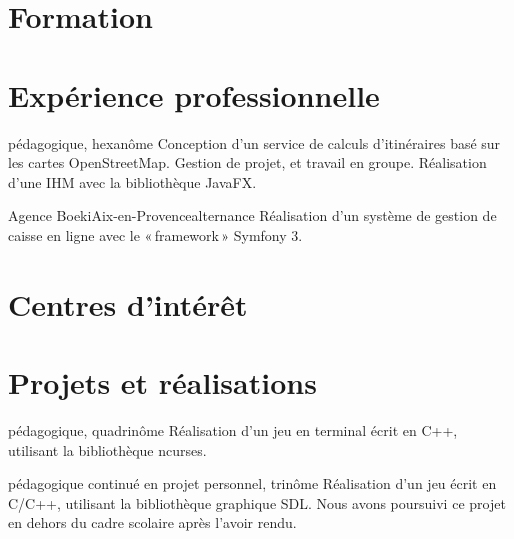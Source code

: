 \documentclass[11pt,a4paper]{moderncv}
\begin{document}
\section{Formation}


\section{Expérience professionnelle}
        {pédagogique, hexanôme}{}{}{
          Conception d'un service de calculs d'itinéraires basé sur les cartes OpenStreetMap.\newline
          Gestion de projet, et travail en groupe.\newline
          Réalisation d'une IHM avec la bibliothèque JavaFX.
        }

        {Agence Boeki}{Aix-en-Provence}{alternance}{
          Réalisation d'un système de gestion de caisse en ligne avec le «\,framework\,» Symfony 3.
        }

\section{Centres d'intérêt}





\section{Projets et réalisations}

        {pédagogique, quadrinôme}{}{}{
          Réalisation d'un jeu en terminal écrit en C++, utilisant la bibliothèque ncurses.
        }

        {pédagogique continué en projet personnel, trinôme}{}{}{
          Réalisation d'un jeu écrit en C/C++, utilisant la bibliothèque graphique SDL.
          Nous avons poursuivi ce projet en dehors du cadre scolaire après l'avoir rendu.
        }
\end{document}
